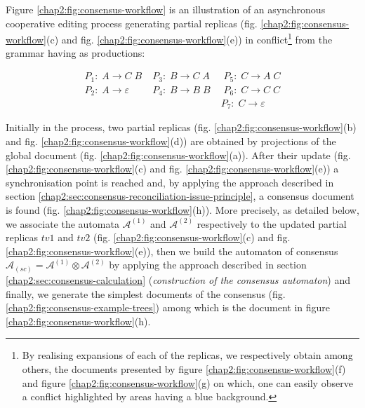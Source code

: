 Figure \ref{chap2:fig:consensus-workflow} %
is an illustration of an asynchronous cooperative editing process generating partial replicas (fig. \ref{chap2:fig:consensus-workflow}(c) and fig. \ref{chap2:fig:consensus-workflow}(e)) in conflict\footnote{By realising expansions of each of the replicas, we respectively obtain among others, the documents presented by figure \ref{chap2:fig:consensus-workflow}(f) and figure \ref{chap2:fig:consensus-workflow}(g) on which, one can easily observe a conflict highlighted by areas having a blue background.} from the grammar having as productions: 
\begin{comment}
$P_{1}:\; A\rightarrow C\; B \qquad P_{2}:\; A\rightarrow \varepsilon \qquad  \; P_{3}:\; B\rightarrow C\; A\; \; \\ ~~~~~~~~~~~~~~~~~~~~~~~~~\qquad P_{4}:\; B\rightarrow B\; B\;    \; \qquad P_{5}:\; C\rightarrow A\; C  \qquad 
				 \; P_{6}:\; C\rightarrow C\; C\qquad  	P_{7}:\;C\rightarrow \varepsilon$
\end{comment}
\[ 
\begin{array}{lll}
				P_{1}:\; A\rightarrow C\; B & \; P_{3}:\; B\rightarrow C\; A\; & \; P_{5}:\; C\rightarrow A\; C  \\
				P_{2}:\; A\rightarrow \varepsilon & \; P_{4}:\; B\rightarrow B\; B\; & \; P_{6}:\; C\rightarrow C\; C\\
				& & P_{7}:\;C\rightarrow \varepsilon
\end{array}
 \]


Initially in the process, two partial replicas (fig. \ref{chap2:fig:consensus-workflow}(b) and fig. \ref{chap2:fig:consensus-workflow}(d)) are obtained by projections of the global document (fig. \ref{chap2:fig:consensus-workflow}(a)). After their update (fig. \ref{chap2:fig:consensus-workflow}(c) and fig. \ref{chap2:fig:consensus-workflow}(e)) a synchronisation point is reached and, by applying the approach described in section \ref{chap2:sec:consensus-reconciliation-issue-principle}, a consensus document is found (fig. \ref{chap2:fig:consensus-workflow}(h)). 
More precisely, as detailed below, we associate the automata $\mathcal{A}^{(1)}$ and $\mathcal{A}^{(2)}$ respectively to the updated partial replicas $tv1$ and $tv2$ (fig. \ref{chap2:fig:consensus-workflow}(c) and fig. \ref{chap2:fig:consensus-workflow}(e)), then we build the automaton of consensus $\mathcal{A}_{(sc)}=\mathcal{A}^{(1)}\otimes\mathcal{A}^{(2)}$ by applying the approach described in section \ref{chap2:sec:consensus-calculation} (\textit{construction of the consensus automaton}) and finally, we generate the simplest documents of the consensus (fig. \ref{chap2:fig:consensus-example-trees}) among which is the document in figure \ref{chap2:fig:consensus-workflow}(h).
